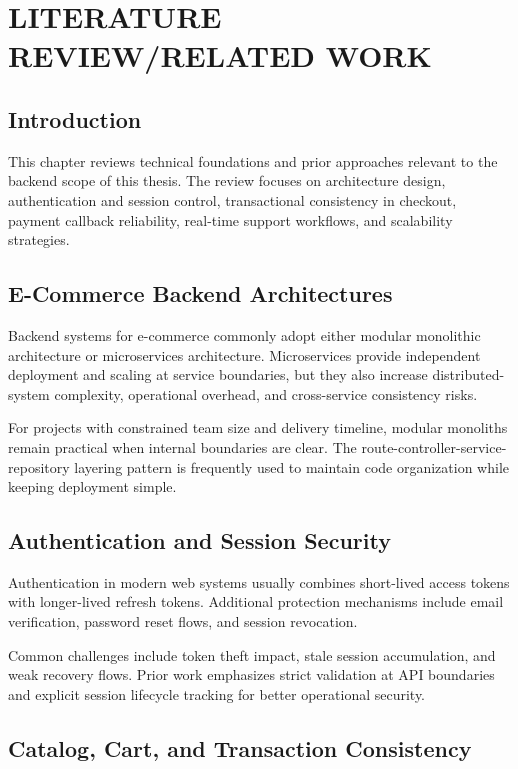 \chapter{LITERATURE REVIEW/RELATED WORK}
\label{ch:related-work}

\section{Introduction}

This chapter reviews technical foundations and prior approaches relevant to the backend scope of this thesis. The review focuses on architecture design, authentication and session control, transactional consistency in checkout, payment callback reliability, real-time support workflows, and scalability strategies.

\section{E-Commerce Backend Architectures}

Backend systems for e-commerce commonly adopt either modular monolithic architecture or microservices architecture. Microservices provide independent deployment and scaling at service boundaries, but they also increase distributed-system complexity, operational overhead, and cross-service consistency risks.

For projects with constrained team size and delivery timeline, modular monoliths remain practical when internal boundaries are clear. The route-controller-service-repository layering pattern is frequently used to maintain code organization while keeping deployment simple.

\section{Authentication and Session Security}

Authentication in modern web systems usually combines short-lived access tokens with longer-lived refresh tokens. Additional protection mechanisms include email verification, password reset flows, and session revocation.

Common challenges include token theft impact, stale session accumulation, and weak recovery flows. Prior work emphasizes strict validation at API boundaries and explicit session lifecycle tracking for better operational security.

\section{Catalog, Cart, and Transaction Consistency}

